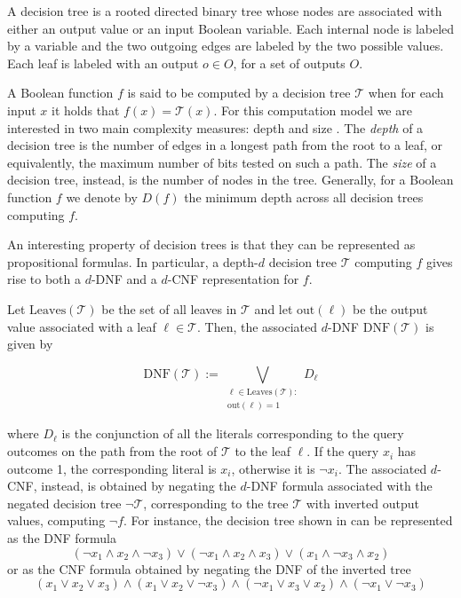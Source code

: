 \begin{definition}
 A decision tree is a rooted directed binary tree whose nodes are associated with either an output value or an input Boolean variable. Each internal node is labeled by a variable and the two outgoing edges are labeled by the two possible values. Each leaf is labeled with an output $o \in O$, for a set of outputs $O$.
\end{definition}

A Boolean function $f$ is said to be computed by a decision tree $\mathcal{T}$ when for each input $x$ it holds that $f(x) = \mathcal{T}(x)$. For this computation model we are interested in two main complexity measures: depth and size \cite{jukna, dt_survey}. The \textit{depth} of a decision tree is the number of edges in a longest path from the root to a leaf, or equivalently, the maximum number of bits tested on such a path. The \textit{size} of a decision tree, instead, is the number of nodes in the tree. Generally, for a Boolean function $f$ we denote by $D(f)$ the minimum depth across all decision trees computing $f$.

An interesting property of decision trees is that they can be represented as propositional formulas. In particular, a depth-$d$ decision tree $\mathcal{T}$ computing $f$ gives rise to both a $d$-DNF and a $d$-CNF representation for $f$.

Let $\mathrm{Leaves}(\mathcal{T})$ be the set of all leaves in $\mathcal{T}$ and let $\mathrm{out}(\ell)$ be the output value associated with a leaf $\ell \in \mathcal{T}$. Then, the associated $d$-DNF $\mathrm{DNF}(\mathcal{T})$ is given by

\begin{equation}
  \mathrm{DNF}(\mathcal{T}) := \bigvee_{\substack{\ell \in \mathrm{Leaves}(\mathcal{T}) :\\ \mathrm{out}(\ell) = 1}} D_\ell
\end{equation}

\noindent
where $D_\ell$ is the conjunction of all the literals corresponding to the query outcomes on the path from the root of $\mathcal{T}$ to the leaf $\ell$. If the query $x_i$ has outcome 1, the corresponding literal is $x_i$, otherwise it is $\lnot x_i$. The associated $d$-CNF, instead, is obtained by negating the $d$-DNF formula associated with the negated decision tree $\lnot \mathcal{T}$, corresponding to the tree $\mathcal{T}$ with inverted output values, computing $\lnot f$. For instance, the decision tree shown in  can be represented as the DNF formula
\begin{equation}
  (\lnot x_1 \land x_2 \land \lnot x_3) \lor (\lnot x_1 \land x_2 \land x_3) \lor (x_1 \land \lnot x_3 \land x_2)
\end{equation}
\noindent
or as the CNF formula obtained by negating the DNF of the inverted tree
\begin{equation}
  (x_1 \lor x_2 \lor x_3) \land (x_1 \lor x_2 \lor \lnot x_3) \land (\lnot x_1 \lor x_3 \lor x_2) \land (\lnot x_1 \lor \lnot x_3)
\end{equation}

